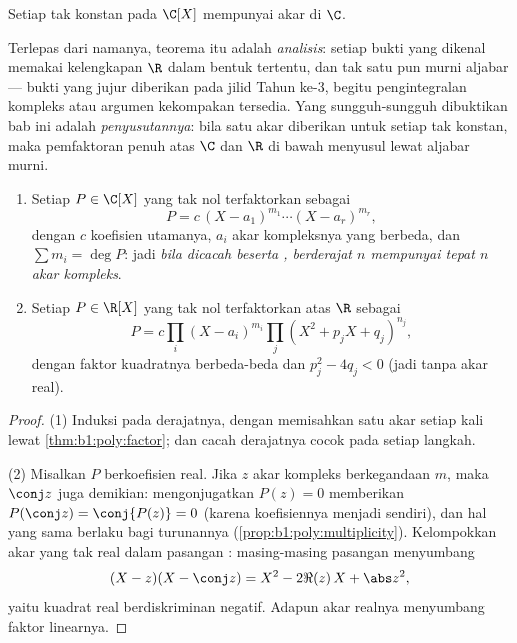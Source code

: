 \begin{theorem}\label{thm:b1:poly:fta}
Setiap  tak konstan pada $\C[X]$ mempunyai akar di
$\C$.
\end{theorem}
\admitted

\begin{remark}
Terlepas dari namanya, teorema itu adalah  \emph{analisis}:
setiap bukti yang dikenal memakai kelengkapan $\R$ dalam bentuk tertentu, dan
tak satu pun murni aljabar --- bukti yang jujur diberikan pada
jilid Tahun ke-3, begitu pengintegralan kompleks atau argumen
kekompakan tersedia. Yang sungguh-sungguh dibuktikan bab ini adalah
\emph{penyusutannya}: bila satu akar diberikan untuk setiap 
tak konstan, maka pemfaktoran penuh atas $\C$ dan $\R$ di bawah
menyusul lewat aljabar murni.
\end{remark}

\begin{corollary}\label{cor:b1:poly:factorization}
\begin{enumerate}
  \item Setiap $P \in \C[X]$ yang tak nol terfaktorkan sebagai
        \[
        P = c\, (X - a_1)^{m_1} \cdots (X - a_r)^{m_r},
        \]
        dengan $c$ koefisien utamanya, $a_i$ akar kompleksnya yang
        berbeda, dan $\sum m_i = \deg P$: jadi \emph{bila dicacah beserta ,
         berderajat $n$ mempunyai tepat $n$ akar kompleks}.
  \item Setiap $P \in \R[X]$ yang tak nol terfaktorkan atas $\R$ sebagai
        \[
        P = c \prod_i (X - a_i)^{m_i} \prod_j (X^2 + p_j X +
        q_j)^{n_j},
        \]
        dengan faktor kuadratnya berbeda-beda dan $p_j^2 - 4q_j < 0$
        (jadi tanpa akar real).
\end{enumerate}
\end{corollary}

\begin{proof}
(1) Induksi pada derajatnya, dengan memisahkan satu akar setiap kali lewat
\cref{thm:b1:poly:factor}; dan cacah derajatnya cocok pada setiap langkah.

(2) Misalkan $P$ berkoefisien real. Jika $z$ akar kompleks
berkegandaan $m$, maka $\conj z$ juga demikian: mengonjugatkan $P(z) = 0$ memberikan
$P(\conj z) = \conj{P(z)} = 0$ (karena koefisiennya menjadi 
sendiri), dan hal yang sama berlaku bagi turunannya
(\cref{prop:b1:poly:multiplicity}). Kelompokkan akar yang tak real dalam
pasangan : masing-masing pasangan menyumbang
\[
(X - z)(X - \conj z) = X^2 - 2\Re(z)\, X + \abs z^2 ,
\]
yaitu kuadrat real berdiskriminan negatif. Adapun akar realnya menyumbang
faktor linearnya.
\end{proof}

